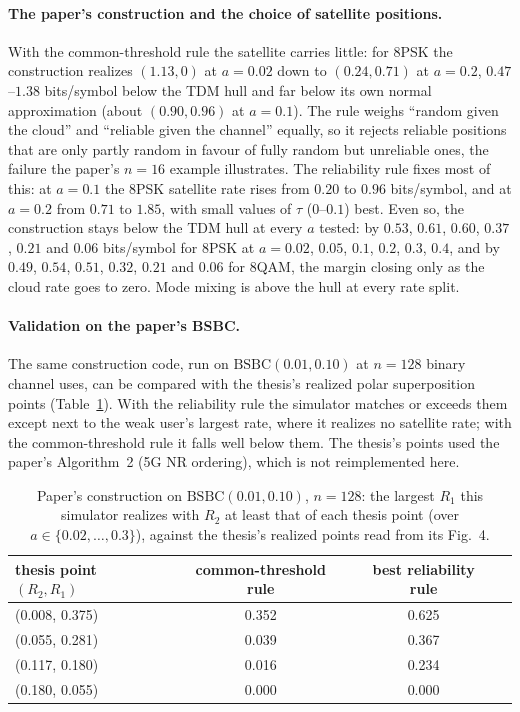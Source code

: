 \documentclass[11pt]{article}
\begin{document}
\paragraph{The paper's construction and the choice of satellite positions.} With the common-threshold rule the satellite carries little: for 8PSK the construction realizes $(1.13,0)$ at $a=0.02$ down to $(0.24,0.71)$ at $a=0.2$, $0.47$--$1.38$ bits/symbol below the TDM hull and far below its own normal approximation (about $(0.90,0.96)$ at $a=0.1$). The rule weighs ``random given the cloud'' and ``reliable given the channel'' equally, so it rejects reliable positions that are only partly random in favour of fully random but unreliable ones, the failure the paper's $n=16$ example illustrates. The reliability rule fixes most of this: at $a=0.1$ the 8PSK satellite rate rises from $0.20$ to $0.96$ bits/symbol, and at $a=0.2$ from $0.71$ to $1.85$, with small values of $\tau$ ($0$--$0.1$) best. Even so, the construction stays below the TDM hull at every $a$ tested: by $0.53$, $0.61$, $0.60$, $0.37$, $0.21$ and $0.06$ bits/symbol for 8PSK at $a=0.02$, $0.05$, $0.1$, $0.2$, $0.3$, $0.4$, and by $0.49$, $0.54$, $0.51$, $0.32$, $0.21$ and $0.06$ for 8QAM, the margin closing only as the cloud rate goes to zero. Mode mixing is above the hull at every rate split.

\paragraph{Validation on the paper's BSBC.} The same construction code, run on $\mathrm{BSBC}(0.01,0.10)$ at $n=128$ binary channel uses, can be compared with the thesis's realized polar superposition points (Table~\ref{tab:gagval}). With the reliability rule the simulator matches or exceeds them except next to the weak user's largest rate, where it realizes no satellite rate; with the common-threshold rule it falls well below them. The thesis's points used the paper's Algorithm~2 (5G NR ordering), which is not reimplemented here.

\begin{table}[t]
\centering
\caption{Paper's construction on $\mathrm{BSBC}(0.01,0.10)$, $n=128$: the largest $R_1$ this simulator realizes with $R_2$ at least that of each thesis point (over $a\in\{0.02,\dots,0.3\}$), against the thesis's realized points read from its Fig.~4.}
\label{tab:gagval}
\begin{tabular}{@{}lccc@{}}
\toprule
thesis point $(R_2, R_1)$ & common-threshold rule & best reliability rule\\
\midrule
(0.008, 0.375) & 0.352 & 0.625\\
(0.055, 0.281) & 0.039 & 0.367\\
(0.117, 0.180) & 0.016 & 0.234\\
(0.180, 0.055) & 0.000 & 0.000\\
\bottomrule
\end{tabular}
\end{table}
\end{document}

